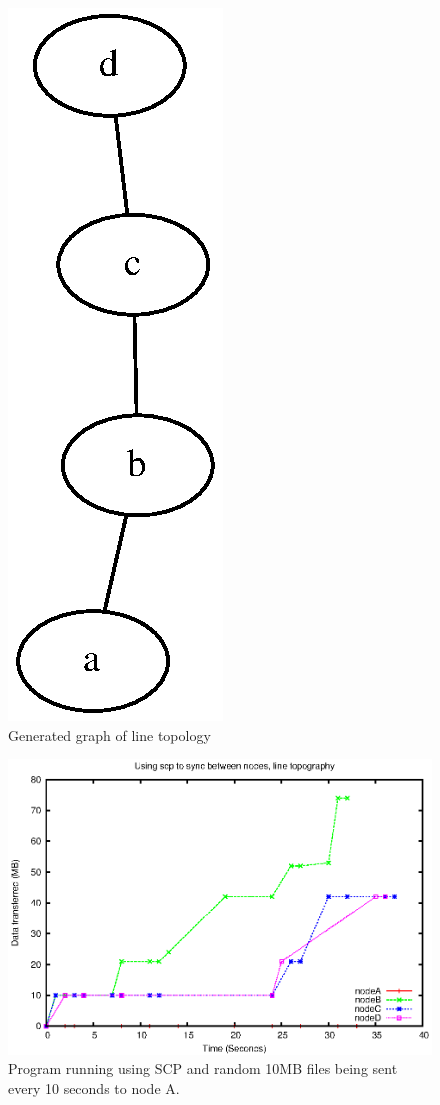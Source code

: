 \documentclass[12pt]{article}
\begin{document}
\pagebreak
\begin{figure}[ht!]
    \centering
    \includegraphics[height=0.4\textheight]{images/line-graph.eps}
    \caption{Generated graph of line topology}
    \label{fig:line_graph}
\end{figure}

\begin{figure}[hb!]
    \centering
    \includegraphics[height=0.4\textheight]{images/line-scp-10-fixes.eps}
    \caption{Program running using SCP and random 10MB files being sent every 10 seconds to node A.}
    \label{fig:line_scp}
\end{figure}
\end{document}
